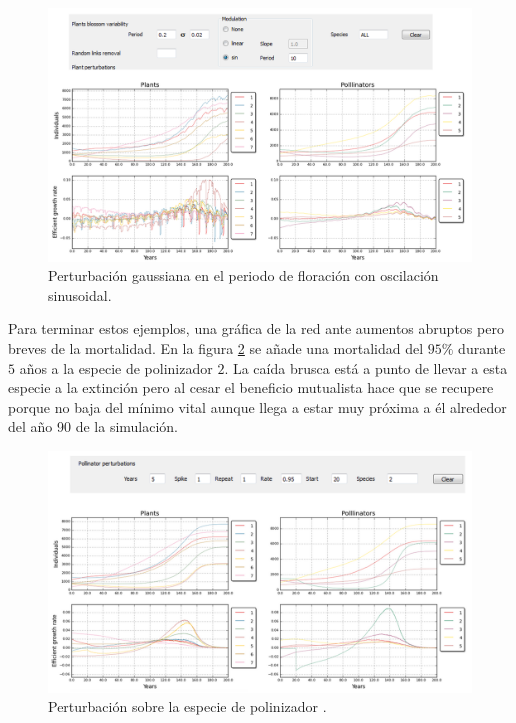 \clearpage
\begin{figure}[ht!]
\centering
\includegraphics[scale=1]{ManFigs/sigmund_oscilacion_tiempo_sin.png}
\caption{Perturbación gaussiana en el periodo de floración con oscilación sinusoidal.}
\label{fig:ASIGMUNDMAN_sigmund_oscilacion_tiempo_sin}
\end{figure}

Para terminar estos ejemplos, una gráfica de la red ante aumentos abruptos pero breves de la mortalidad. En la figura \ref{fig:ASIGMUNDMAN_sigmund_95} se añade una mortalidad del $95\%$ durante $5$ años a la especie de polinizador $2$. La caída brusca está a punto de llevar a esta especie a la extinción pero al cesar el beneficio mutualista hace que se recupere porque no baja del mínimo vital aunque llega a estar muy próxima a él alrededor del año 90 de la simulación.

\begin{figure}[h!]
\centering
\includegraphics[scale=1]{ManFigs/sigmund_95.png}
\caption{Perturbación sobre la especie de polinizador .}
\label{fig:ASIGMUNDMAN_sigmund_95}
\end{figure}